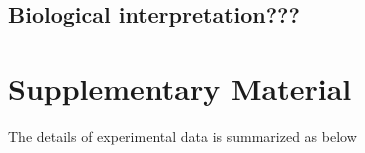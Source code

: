 \documentclass[11pt, a4paper]{article}
\begin{document}
\subsection{Biological interpretation???}
%  
%  

\section{Supplementary Material}
The details of experimental data is summarized as below
\end{document}
